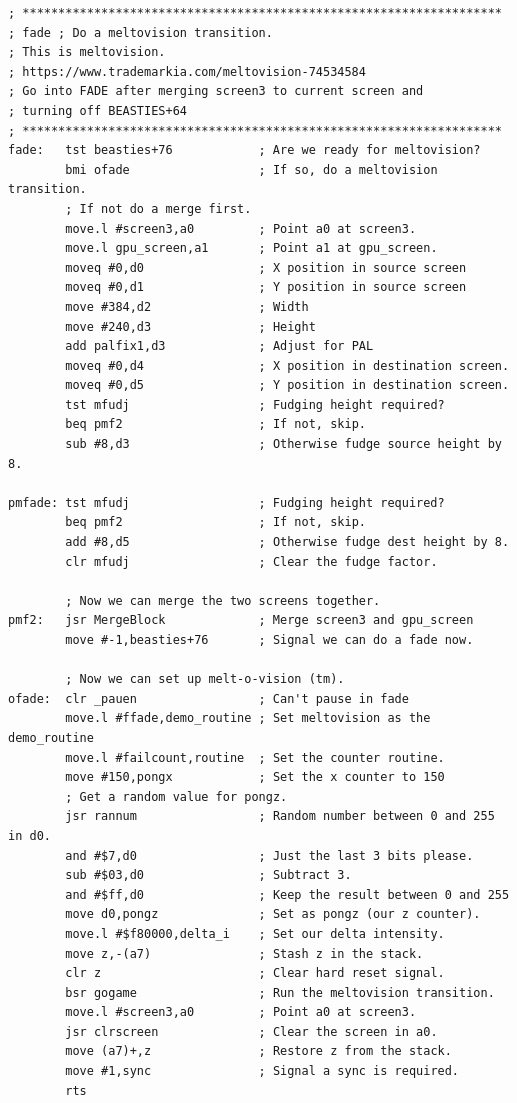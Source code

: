 \begin{lstlisting}
; *******************************************************************
; fade ; Do a meltovision transition.
; This is meltovision.
; https://www.trademarkia.com/meltovision-74534584
; Go into FADE after merging screen3 to current screen and
; turning off BEASTIES+64
; *******************************************************************
fade:   tst beasties+76            ; Are we ready for meltovision?
        bmi ofade                  ; If so, do a meltovision transition.
        ; If not do a merge first.
        move.l #screen3,a0         ; Point a0 at screen3.
        move.l gpu_screen,a1       ; Point a1 at gpu_screen.
        moveq #0,d0                ; X position in source screen
        moveq #0,d1                ; Y position in source screen
        move #384,d2               ; Width
        move #240,d3               ; Height
        add palfix1,d3             ; Adjust for PAL
        moveq #0,d4                ; X position in destination screen.
        moveq #0,d5                ; Y position in destination screen.
        tst mfudj                  ; Fudging height required?
        beq pmf2                   ; If not, skip.
        sub #8,d3                  ; Otherwise fudge source height by 8.
    
pmfade: tst mfudj                  ; Fudging height required?
        beq pmf2                   ; If not, skip.
        add #8,d5                  ; Otherwise fudge dest height by 8.
        clr mfudj                  ; Clear the fudge factor.

        ; Now we can merge the two screens together. 
pmf2:   jsr MergeBlock             ; Merge screen3 and gpu_screen
        move #-1,beasties+76       ; Signal we can do a fade now.
    
        ; Now we can set up melt-o-vision (tm).
ofade:  clr _pauen                 ; Can't pause in fade
        move.l #ffade,demo_routine ; Set meltovision as the demo_routine
        move.l #failcount,routine  ; Set the counter routine.
        move #150,pongx            ; Set the x counter to 150
        ; Get a random value for pongz.
        jsr rannum                 ; Random number between 0 and 255 in d0.
        and #$7,d0                 ; Just the last 3 bits please.
        sub #$03,d0                ; Subtract 3.
        and #$ff,d0                ; Keep the result between 0 and 255
        move d0,pongz              ; Set as pongz (our z counter).
        move.l #$f80000,delta_i    ; Set our delta intensity.
        move z,-(a7)               ; Stash z in the stack.
        clr z                      ; Clear hard reset signal.
        bsr gogame                 ; Run the meltovision transition.
        move.l #screen3,a0         ; Point a0 at screen3.
        jsr clrscreen              ; Clear the screen in a0.
        move (a7)+,z               ; Restore z from the stack.
        move #1,sync               ; Signal a sync is required.
        rts
\end{lstlisting}
\clearpage


